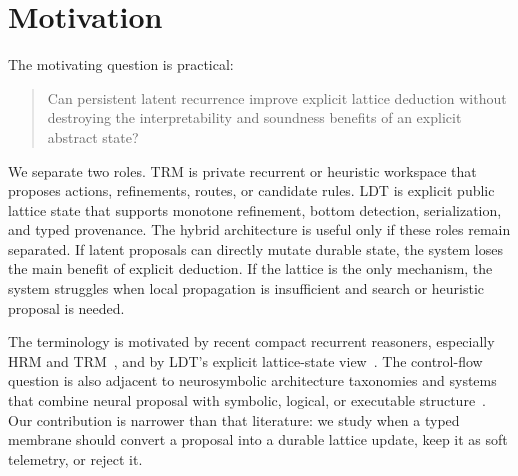 \documentclass[11pt]{article}
\begin{document}
\begin{abstract}
Finally, we pass calibration-derived sequence rules through an AIRIS/DAS-shaped retrieval service and isolate forecast transport integrity. Across 6,670 paired clean and fault-injection trials, digest sealing preserves 100\% clean acceptance while reducing negative-control acceptance from 44.4\% under topology-only arbitration to zero. This is a deterministic authorization result, not evidence for learned AIRIS robustness.
Independently induced context rules achieve 94.0\% held-out episode-winner precision, but exactly reproduce the
frozen controller; confidence demotion therefore changes acceptance without changing behavior. Storyworld
precision falls to 65.6\%--78.1\%, motivating state-conditioned typed fallback rather than context confidence alone.
\end{abstract}

\section{Motivation}

The motivating question is practical:
\begin{quote}
Can persistent latent recurrence improve explicit lattice deduction without destroying the interpretability and soundness benefits of an explicit abstract state?
\end{quote}

We separate two roles. TRM is private recurrent or heuristic workspace that proposes actions, refinements, routes, or candidate rules. LDT is explicit public lattice state that supports monotone refinement, bottom detection, serialization, and typed provenance. The hybrid architecture is useful only if these roles remain separated. If latent proposals can directly mutate durable state, the system loses the main benefit of explicit deduction. If the lattice is the only mechanism, the system struggles when local propagation is insufficient and search or heuristic proposal is needed.

The terminology is motivated by recent compact recurrent reasoners, especially HRM and TRM~\cite{wang2025hrm,jolicoeurmartineau2025trm}, and by LDT's explicit lattice-state view~\cite{davis2026ldt}. The control-flow question is also adjacent to neurosymbolic architecture taxonomies and systems that combine neural proposal with symbolic, logical, or executable structure~\cite{kautz2022third,garcez2020neurosymbolic,manhaeve2018deepproblog,dong2019nlm,yao2022react}. Our contribution is narrower than that literature: we study when a typed membrane should convert a proposal into a durable lattice update, keep it as soft telemetry, or reject it.
\end{document}
